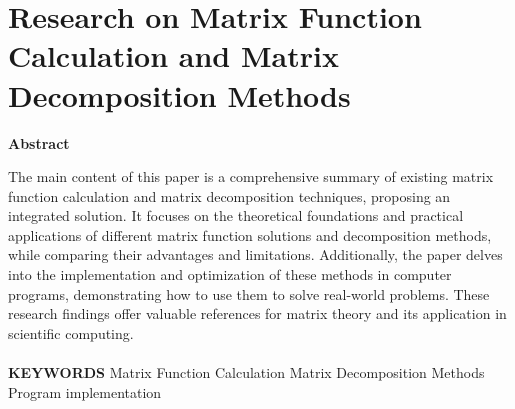 \thispagestyle{empty}
\section*{Research on Matrix Function Calculation and Matrix Decomposition Methods}
\fontsize{12pt}{14pt}\selectfont
    \begin{center}
        \textbf{\large Abstract}
    \end{center}
    \par The main content of this paper is a comprehensive summary of existing matrix function calculation and matrix decomposition techniques, proposing an integrated solution. It focuses on the theoretical foundations and practical applications of different matrix function solutions and decomposition methods, while comparing their advantages and limitations. Additionally, the paper delves into the implementation and optimization of these methods in computer programs, demonstrating how to use them to solve real-world problems. These research findings offer valuable references for matrix theory and its application in scientific computing.
    \\
    \\
    \textbf{KEYWORDS} \quad Matrix Function Calculation \quad Matrix Decomposition Methods \quad Program implementation